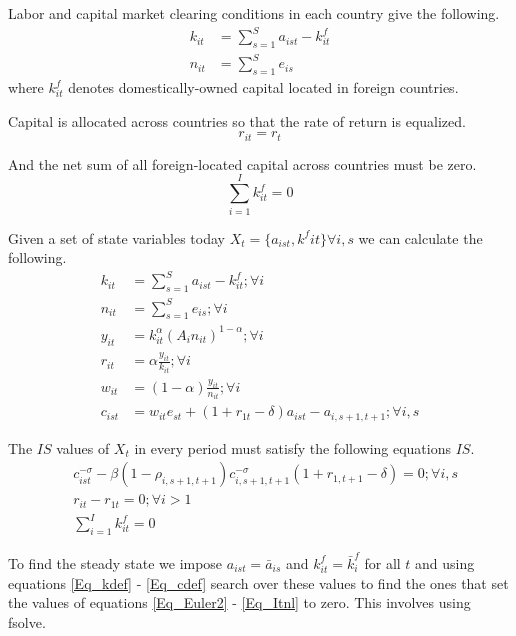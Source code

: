 \documentclass[letterpaper,12pt]{article}
\theoremstyle{definition}
\numberwithin{equation}{section}
\begin{document}
\begin{spacing}{1.5}
	Labor and capital market clearing conditions in each country give the following.
	\begin{align}
		k_{it} & = \sum_{s=1}^S a_{ist} - k_{it}^f\\
		n_{it} & = \sum_{s=1}^S e_{is}
	\end{align}
	where $k_{it}^f$ denotes domestically-owned capital located in foreign countries.

	Capital is allocated across countries so that the rate of return is equalized.
	\begin{equation} \label{Eq_requal}
		r_{it} = r_t
	\end{equation}

	And the net sum of all foreign-located capital across countries must be zero.
	\begin{equation}
		\sum_{i=1}^I k^f_{it} = 0
	\end{equation}

	Given a set of state variables today $X_t = \{a_{ist},k^f{it}\} \forall i,s$ we can calculate the following.
	\begin{align}
		k_{it} & = \sum_{s=1}^S a_{ist} - k_{it}^f; \forall i \label{Eq_kdef}\\
		n_{it} & = \sum_{s=1}^S e_{is}; \forall i \\
		y_{it} & = k_{it}^\alpha \left( A_{i} n_{it} \right)^{1-\alpha} ; \forall i \\
		r_{it} & = \alpha \frac{y_{it}}{k_{it}}; \forall i \label{Eq_rdef}\\
		w_{it} & = (1-\alpha) \frac{y_{it}}{n_{it}}; \forall i \label{Eq_wdef}\\		
    	c_{ist} & = w_{it} e_{st} + (1+r_{1t}-\delta)a_{ist} - a_{i,s+1,t+1} ; \forall i,s \label{Eq_cdef}
	\end{align}

	The $IS$ values of $X_t$ in every period must satisfy the following equations $IS$.
	\begin{align}
		& c_{ist}^{-\sigma} - \beta (1-\rho_{i,s+1,t+1}) c_{i,s+1,t+1}^{-\sigma}(1+r_{1,t+1}-\delta) = 0; \forall i,s \label{Eq_Euler2}\\ 
		& r_{it} - r_{1t} = 0; \forall i>1 \\
		& \sum_{i=1}^I k^f_{it} = 0 \label{Eq_Itnl}
	\end{align}

	To find the steady state we impose $a_{ist} = \bar a_{is}$ and $k^f_{it}=\bar k^f_i$ for all $t$ and using equations \eqref{Eq_kdef} - \eqref{Eq_cdef} search over these values to find the ones that set the values of equations \eqref{Eq_Euler2} - \eqref{Eq_Itnl} to zero.  This involves using fsolve.


\end{spacing}
\end{document}
